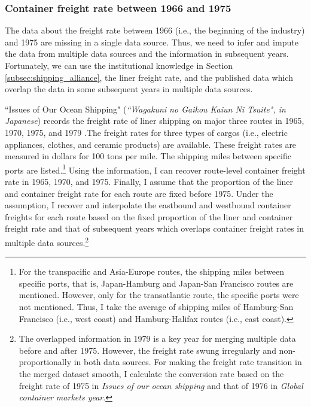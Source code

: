 \subsubsection{Container freight rate between 1966 and 1975}



The data about the freight rate between 1966 (i.e., the beginning of the industry) and 1975 are missing in a single data source. Thus, we need to infer and impute the data from multiple data sources and the information in subsequent years. Fortunately, we can use the institutional knowledge in Section \ref{subsec:shipping_alliance}, the liner freight rate, and the published data which overlap the data in some subsequent years in multiple data sources.

``Issues of Our Ocean Shipping" (\textit{``Wagakuni no Gaikou Kaiun Ni Tsuite", in Japanese}) records the freight rate of liner shipping on major three routes in 1965, 1970, 1975, and 1979 .The freight rates for three types of cargos (i.e., electric appliances, clothes, and ceramic products) are available. These freight rates are measured in dollars for 100 tons per mile. The shipping miles between specific ports are listed.\footnote{For the transpacific and Asia-Europe routes, the shipping miles between specific ports, that is, Japan-Hamburg and Japan-San Francisco routes are mentioned. However, only for the transatlantic route, the specific ports were not mentioned. Thus, I take the average of shipping miles of Hamburg-San Francisco (i.e., west coast) and Hamburg-Halifax routes (i.e., east coast).} Using the information, I can recover route-level container freight rate in 1965, 1970, and 1975. Finally, I assume that the proportion of the liner and container freight rate for each route are fixed before 1975. Under the assumption, I recover and interpolate the eastbound and westbound container freights for each route based on the fixed proportion of the liner and container freight rate and that of subsequent years which overlaps container freight rates in multiple data sources.\footnote{The overlapped information in 1979 is a key year for merging multiple data before and after 1975. However, the freight rate swung irregularly and non-proportionally in both data sources. For making the freight rate transition in the merged dataset smooth, I calculate the conversion rate based on the freight rate of 1975 in \textit{Issues of our ocean shipping} and that of 1976 in \textit{Global container markets year}.}



